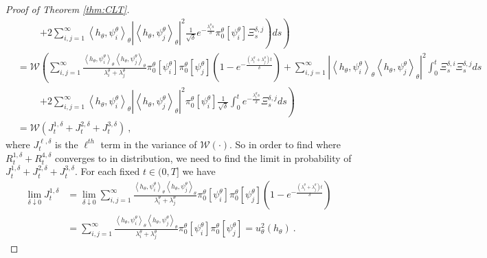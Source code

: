 \documentclass{article}
\begin{document}
\begin{proof} [Proof of Theorem \ref{thm:CLT}]
\begin{align}
&\hspace{1cm}\left.\left.+
2\sum_{i,j=1}^{\infty}\left<h_{\theta},\psi_i^{\theta}\right>_{\theta}\left|\left<h_{\theta},\psi_j^{\theta}\right>_{\theta}\right|^{2}\frac{1}{\sqrt\delta}e^{-\frac{\lambda_i^{\theta} s}{\delta}}\pi_0^{\theta}[\psi_i^{\theta}]\Xi^{\delta,j}_{s}\right)ds\right)\nonumber\\
&=\mathcal{W}\left( \sum_{i,j=1}^{\infty}\frac{\left<h_{\theta},\psi_i^{\theta}\right>_{\theta}\left<h_{\theta},\psi_j^{\theta}\right>_{\theta}}{\lambda_i^{\theta} +\lambda_j^{\theta}} \pi_0^{\theta}[\psi_i^{\theta}]\pi_0^{\theta}[\psi_j^{\theta}]\left(1-e^{-\frac{\left(\lambda_i^{\theta}+\lambda_j^{\theta}\right) t}{\delta}}\right)+
\sum_{i,j=1}^{\infty}\left|\left<h_{\theta},\psi_i^{\theta}\right>_{\theta}\left<h_{\theta},\psi_j^{\theta}\right>_{\theta}\right|^{2}\int_{0}^{t}\Xi^{\delta,i}_{s}\Xi^{\delta,j}_{s}ds\right.\nonumber\\
&\hspace{1cm}\left.+
2\sum_{i,j=1}^{\infty}\left<h_{\theta},\psi_i^{\theta}\right>_{\theta}\left|\left<h_{\theta},\psi_j^{\theta}\right>_{\theta}\right|^{2}\pi_0^{\theta}[\psi_i^{\theta}]\frac{1}{\sqrt\delta}\int_{0}^{t}e^{-\frac{\lambda_i^{\theta} s}{\delta}}\Xi^{\delta,j}_{s}ds\right)\nonumber\\
&=\mathcal{W}\left( J^{1,\delta}_{t}+J^{2,\delta}_{t}+J^{3,\delta}_{t}\right)\ ,
\label{Eq:sum3Js}
\end{align}
where $J^{\ell,\delta}_{t}$ is the $\ell^{th}$ term in the variance of $\mathcal{W}(\cdot)$. So in order to find where $R^{1,\delta}_{t}+R^{4,\delta}_{t}$ converges to in distribution, we need to find the limit in probability of $J^{1,\delta}_{t}+J^{2,\delta}_{t}+J^{3,\delta}_{t}$. For each fixed  $t\in(0,T]$ we have
\begin{align}
\lim_{\delta\downarrow 0}J^{1,\delta}_{t}&=\lim_{\delta\downarrow 0}\sum_{i,j=1}^{\infty}\frac{\left<h_{\theta},\psi_i^{\theta}\right>_{\theta}\left<h_{\theta},\psi_j^{\theta}\right>_{\theta}}{\lambda_i^{\theta} +\lambda_j^{\theta}} \pi_0^{\theta}[\psi_i^{\theta}]\pi_0^{\theta}[\psi_j^{\theta}]\left(1-e^{-\frac{\left(\lambda_i^{\theta}+\lambda_j^{\theta}\right) t}{\delta}}\right)\nonumber\\
&=\sum_{i,j=1}^{\infty}\frac{\left<h_{\theta},\psi_i^{\theta}\right>_{\theta}\left<h_{\theta},\psi_j^{\theta}\right>_{\theta}}{\lambda_i^{\theta} +\lambda_j^{\theta}} \pi_0^{\theta}[\psi_i^{\theta}]\pi_0^{\theta}[\psi_j^{\theta}]=u^{2}_{\theta}(h_{\theta})\ .
\label{Eq:uthetaLimit}
\end{align}



\end{proof}
\end{document}
